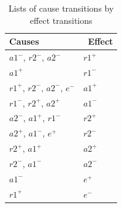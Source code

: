 \documentclass[british,conference,compsoc]{IEEEtran}
\begin{document}
%
%
%

%




\begin{table}[h]
\caption{Lists of cause transitions by effect transitions
		\label{tab:list-of-concepts}}
  \centering
\begin{tabular}[htb]{| m{2.7cm} | m{2.0cm} |}
  \hline
Causes & \, Effect \\ \hline \hline
$a1^{-}$, $r2^{-}$, $a2^{-}$ 			& $r1^{+}$ 	\\ \hline
$a1^{+}$ 						& $r1^{-}$ 	\\ \hline
$r1^{+}$, $r2^{-}$, $a2^{-}$, $e^{-}$ 	& $a1^{+}$ 	\\ \hline
$r1^{-}$, $r2^{+}$, $a2^{+}$ 			& $a1^{-}$ 	\\ \hline
$a2^{-}$, $a1^{+}$, $r1^{-}$ 			& $r2^{+}$ 	\\ \hline
$a2^{+}$, $a1^{-}$, $e^{+}$ 			& $r2^{-}$ 	\\ \hline
$r2^{+}$, $a1^{+}$ 				& $a2^{+}$ 	\\ \hline
$r2^{-}$, $a1^{-}$ 				& $a2^{-}$ 	\\ \hline
$a1^{-}$ 						& $e^{+}$ 	\\ \hline
$r1^{+}$ 						& $e^{-}$	\\ \hline

  \end{tabular}
  \vspace{-3mm}
\end{table}
\end{document}
